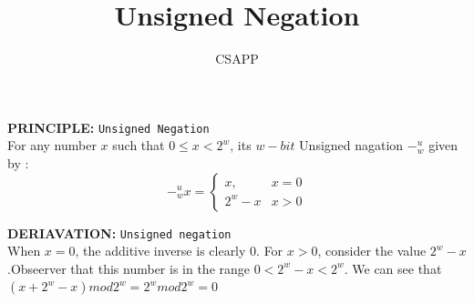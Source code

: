 \documentclass{article}
\title{Unsigned Negation}
\author{CSAPP}
\begin{document}
\maketitle

\begin{flushleft}
\textbf{\small PRINCIPLE:} \texttt{Unsigned Negation }\\
For any number $x$ such that $0 \leq x < 2^w$, its $w-bit$ Unsigned
nagation $-^u_w$ given by :
\[
    -^u_w x = \begin{cases}
        x,       & x = 0\\
        2^w - x  & x > 0 
    \end{cases}
\]

\smallskip
\textbf{\small DERIAVATION:} \texttt{Unsigned negation}\\
    When $x = 0$, the additive inverse is clearly $0$. For $x > 0$, consider
    the value $2^w-x$.Obseerver that this number is in the range $0 < 2^w - x < 2^w$. We can
    see that $(x+2^w-x) mod 2^w = 2^w mod 2^w = 0$
\end{flushleft}
\end{document}
